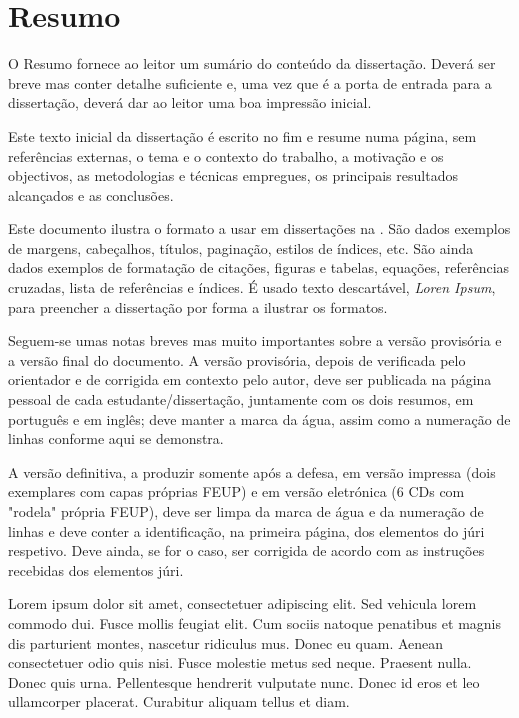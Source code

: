 \chapter*{Resumo}

O Resumo fornece ao leitor um sumário do conteúdo da dissertação.
Deverá ser breve mas conter detalhe suficiente e, uma vez que é a porta
de entrada para a dissertação, deverá dar ao leitor uma boa impressão
inicial.

Este texto inicial da dissertação é escrito no fim e resume numa
página, sem referências externas, o tema e o contexto do trabalho, a
motivação e os objectivos, as metodologias e técnicas empregues, os
principais resultados alcançados e as conclusões.

Este documento ilustra o formato a usar em dissertações na \Feup.
São dados exemplos de margens, cabeçalhos, títulos, paginação, estilos
de índices, etc. 
São ainda dados exemplos de formatação de citações, figuras e tabelas,
equações, referências cruzadas, lista de referências e índices.
É usado texto descartável, \emph{Loren Ipsum}, para preencher a
dissertação por forma a ilustrar os formatos.

Seguem-se umas notas breves mas muito importantes sobre a versão 
provisória e a versão final do documento. 
A versão provisória, depois de verificada pelo orientador e de 
corrigida em contexto pelo autor, deve ser publicada na página 
pessoal de cada estudante/dissertação, juntamente com os dois 
resumos, em português e em inglês; deve manter a marca da água, 
assim como a numeração de linhas conforme aqui se demonstra.

A versão definitiva, a produzir somente após a defesa, em versão 
impressa (dois exemplares com capas próprias FEUP) e em versão 
eletrónica (6 CDs com "rodela" própria FEUP), deve ser limpa da marca de 
água e da numeração de linhas e deve conter a identificação, na primeira 
página, dos elementos do júri respetivo. 
Deve ainda, se for o caso, ser corrigida de acordo com as instruções 
recebidas dos elementos júri.

Lorem ipsum dolor sit amet, consectetuer adipiscing elit. Sed vehicula
lorem commodo dui. Fusce mollis feugiat elit. Cum sociis natoque
penatibus et magnis dis parturient montes, nascetur ridiculus
mus. Donec eu quam. Aenean consectetuer odio quis nisi. Fusce molestie
metus sed neque. Praesent nulla. Donec quis urna. Pellentesque
hendrerit vulputate nunc. Donec id eros et leo ullamcorper
placerat. Curabitur aliquam tellus et diam. 


